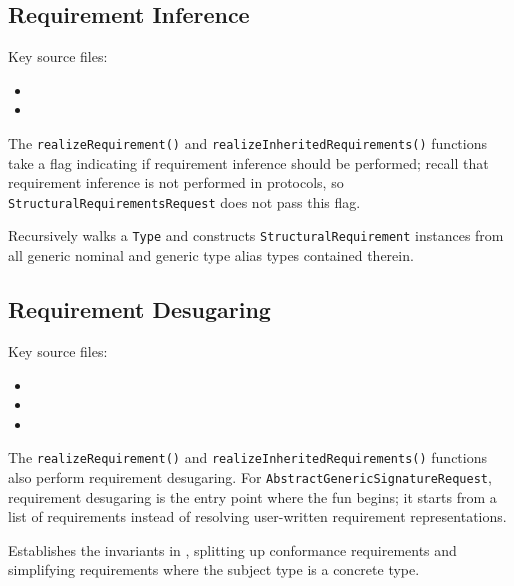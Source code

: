 \documentclass[../generics]{subfiles}
\begin{document}
\subsection*{Requirement Inference}

Key source files:
\begin{itemize}
\item {}
\item {}
\end{itemize}
The \texttt{realizeRequirement()} and \texttt{realizeInheritedRequirements()} functions take a flag indicating if requirement inference should be performed; recall that requirement inference is not performed in protocols, so \texttt{StructuralRequirementsRequest} does not pass this flag.

Recursively walks a \texttt{Type} and constructs \texttt{StructuralRequirement} instances from all generic nominal and generic type alias types contained therein.

\subsection*{Requirement Desugaring}

Key source files:
\begin{itemize}
\item {}
\item {}
\item {}
\end{itemize}

The \texttt{realizeRequirement()} and \texttt{realizeInheritedRequirements()} functions also perform requirement desugaring. For \texttt{AbstractGenericSignatureRequest}, requirement desugaring is the entry point where the fun begins; it starts from a list of requirements instead of resolving user-written requirement representations.

Establishes the invariants in , splitting up conformance requirements and simplifying requirements where the subject type is a concrete type.
\end{document}
